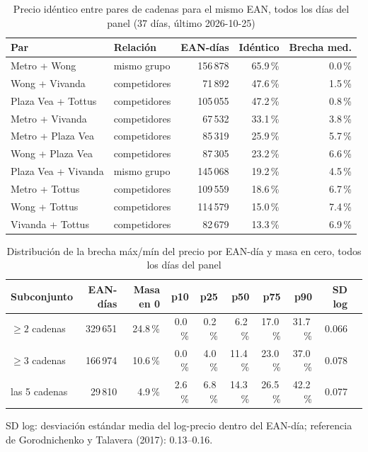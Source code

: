 
\begin{table}[htbp]
\caption{Precio id\'entico entre pares de cadenas para el mismo EAN, todos los d\'ias del panel (37 d\'ias, \'ultimo 2026-10-25)}
\label{tab:identidad}
\centering\scriptsize\setlength{\tabcolsep}{3pt}
\begin{tabular}{@{}llrrr@{}}
\toprule
Par & Relaci\'on & EAN-d\'ias & Id\'entico & Brecha med. \\
\midrule
Metro + Wong & mismo grupo & 156\,878 & 65.9\,\% & 0.0\,\% \\
Wong + Vivanda & competidores & 71\,892 & 47.6\,\% & 1.5\,\% \\
Plaza Vea + Tottus & competidores & 105\,055 & 47.2\,\% & 0.8\,\% \\
Metro + Vivanda & competidores & 67\,532 & 33.1\,\% & 3.8\,\% \\
Metro + Plaza Vea & competidores & 85\,319 & 25.9\,\% & 5.7\,\% \\
Wong + Plaza Vea & competidores & 87\,305 & 23.2\,\% & 6.6\,\% \\
Plaza Vea + Vivanda & mismo grupo & 145\,068 & 19.2\,\% & 4.5\,\% \\
Metro + Tottus & competidores & 109\,559 & 18.6\,\% & 6.7\,\% \\
Wong + Tottus & competidores & 114\,579 & 15.0\,\% & 7.4\,\% \\
Vivanda + Tottus & competidores & 82\,679 & 13.3\,\% & 6.9\,\% \\
\bottomrule\end{tabular}\end{table}

\begin{table}[t]
\caption{Distribuci\'on de la brecha m\'ax/m\'in del precio por EAN-d\'ia y masa en cero, todos los d\'ias del panel}
\label{tab:brecha}
\centering\scriptsize\setlength{\tabcolsep}{4pt}
\begin{tabular}{@{}lrrrrrrrrr@{}}
\toprule
Subconjunto & EAN-d\'ias & Masa en 0 & p10 & p25 & p50 & p75 & p90 & SD log \\
\midrule
$\geq 2$ cadenas & 329\,651 & 24.8\,\% & 0.0\,\% & 0.2\,\% & 6.2\,\% & 17.0\,\% & 31.7\,\% & 0.066 \\
$\geq 3$ cadenas & 166\,974 & 10.6\,\% & 0.0\,\% & 4.0\,\% & 11.4\,\% & 23.0\,\% & 37.0\,\% & 0.078 \\
las 5 cadenas & 29\,810 & 4.9\,\% & 2.6\,\% & 6.8\,\% & 14.3\,\% & 26.5\,\% & 42.2\,\% & 0.077 \\
\bottomrule\end{tabular}
\par\smallskip\raggedright\scriptsize SD log: desviaci\'on est\'andar media del log-precio dentro del EAN-d\'ia; referencia de Gorodnichenko y Talavera (2017): 0.13--0.16.
\end{table}

